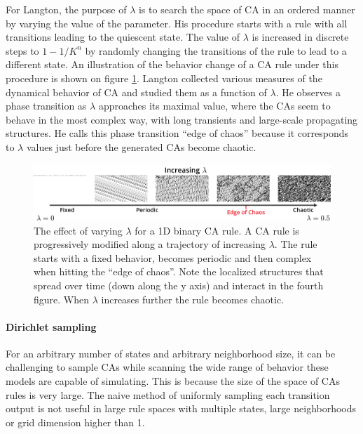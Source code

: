 For Langton, the purpose of $\lambda$ is to search the space of \ac{CA} in an ordered
manner by varying the value of the parameter. His procedure starts with a rule
with all transitions leading to the quiescent state. The value of $\lambda$ is
increased in discrete steps to $1 - 1 / K^{n}$ by randomly changing the
transitions of the rule to lead to a different state. An illustration of the
behavior change of a \ac{CA} rule under this procedure is shown on figure
\ref{fig:langton_lambda}. Langton collected various measures of the dynamical
behavior of \ac{CA} and studied them as a function of $\lambda$. He observes a phase
transition as $\lambda$ approaches its maximal value, where the \acp{CA} seem to behave
in the most complex way, with long transients and large-scale propagating
structures. He calls this phase transition ``edge of chaos'' because it
corresponds to $\lambda$ values just before the generated \acp{CA} become
chaotic.

\begin{figure}[htbp]
  \centering
  \includegraphics[width=\linewidth]{figures/langton_lambda.pdf}
  \caption{The effect of varying $\lambda$ for a 1D binary \ac{CA} rule. A \ac{CA}
    rule is progressively modified along a trajectory of increasing $\lambda$. The
    rule starts with a fixed behavior, becomes periodic and then complex when
    hitting the ``edge of chaos''. Note the localized structures that spread
    over time (down along the y axis) and interact in the fourth figure. When
    $\lambda$ increases further the rule becomes chaotic.}
  \label{fig:langton_lambda}
\end{figure}

\paragraph{Dirichlet sampling}
For an arbitrary number of states and arbitrary neighborhood size, it can be
challenging to sample \acp{CA} while scanning the wide range of behavior these
models are capable of simulating. This is because the size of the space of
\acp{CA} rules is very large. The naive method of uniformly sampling each
transition output is not useful in large rule spaces with multiple states, large
neighborhoods or grid dimension higher than 1.

